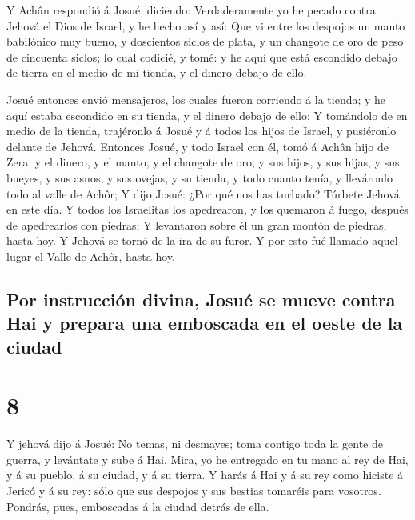  Y Achân respondió á Josué, diciendo: Verdaderamente yo he
pecado contra Jehová el Dios de Israel, y he hecho así y así:
 Que vi entre los despojos un manto babilónico muy bueno, y
doscientos siclos de plata, y un changote de oro de peso de cincuenta
siclos; lo cual codicié, y tomé: y he aquí que está escondido debajo de
tierra en el medio de mi tienda, y el dinero debajo de ello.

 Josué entonces envió mensajeros, los cuales fueron
corriendo á la tienda; y he aquí estaba escondido en su tienda, y el
dinero debajo de ello:  Y tomándolo de en medio de la
tienda, trajéronlo á Josué y á todos los hijos de Israel, y pusiéronlo
delante de Jehová.  Entonces Josué, y todo Israel con él,
tomó á Achân hijo de Zera, y el dinero, y el manto, y el changote de
oro, y sus hijos, y sus hijas, y sus bueyes, y sus asnos, y sus ovejas,
y su tienda, y todo cuanto tenía, y lleváronlo todo al valle de Achôr;
 Y dijo Josué: ¿Por qué nos has turbado? Túrbete Jehová en
este día. Y todos los Israelitas los apedrearon, y los quemaron á fuego,
después de apedrearlos con piedras;  Y levantaron sobre él
un gran montón de piedras, hasta hoy. Y Jehová se tornó de la ira de su
furor. Y por esto fué llamado aquel lugar el Valle de Achôr, hasta hoy.

\hypertarget{por-instrucciuxf3n-divina-josuuxe9-se-mueve-contra-hai-y-prepara-una-emboscada-en-el-oeste-de-la-ciudad}{%
\subsection{Por instrucción divina, Josué se mueve contra Hai y prepara
una emboscada en el oeste de la
ciudad}\label{por-instrucciuxf3n-divina-josuuxe9-se-mueve-contra-hai-y-prepara-una-emboscada-en-el-oeste-de-la-ciudad}}

\hypertarget{section-7}{%
\section{8}\label{section-7}}

 Y jehová dijo á Josué: No temas, ni desmayes; toma contigo
toda la gente de guerra, y levántate y sube á Hai. Mira, yo he entregado
en tu mano al rey de Hai, y á su pueblo, á su ciudad, y á su tierra.
 Y harás á Hai y á su rey como hiciste á Jericó y á su rey:
sólo que sus despojos y sus bestias tomaréis para vosotros. Pondrás,
pues, emboscadas á la ciudad detrás de ella.

